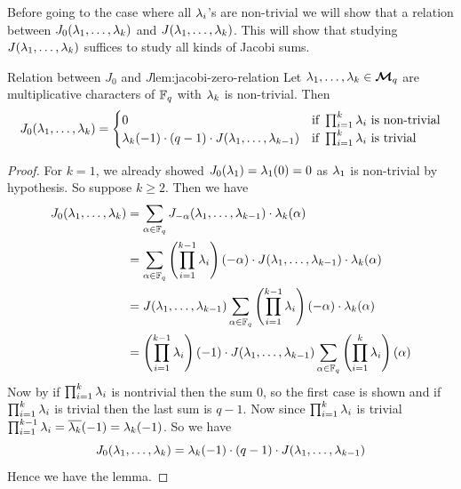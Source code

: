 Before going to the case where all $\lambda_i$'s are non-trivial we will show that a relation between $J_0(\lambda_1,\dots,\lambda_k)$ and $J(\lambda_1,\dots, \lambda_k)$. This will show that studying $J(\lambda_1,\dots, \lambda_k)$ suffices to study all kinds of Jacobi sums. 
\begin{lemma}{Relation between $J_0$ and $J$}{lem:jacobi-zero-relation}
  Let $\lambda_1,\dots,\lambda_k\in\boldsymbol{\mathcal{M}}_q$ are multiplicative characters of $\mathbb{F}_q$ with $\lambda_k$ is non-trivial. Then $$J_0(\lambda_1,\dots,\lambda_k)=\begin{cases}
    0 &\text{if }\prod_{i=1}^k\lambda_i\text{ is non-trivial}\\
    \lambda_k(-1)\cdot (q-1)\cdot J(\lambda_1,\dots,\lambda_{k-1}) & \text{if }\prod_{i=1}^k\lambda_i\text{ is trivial}
  \end{cases}$$
\end{lemma}
\begin{proof}
  For $k=1$, we already showed $J_0(\lambda_1)=\lambda_1(0)=0$ as $\lambda_1$ is non-trivial by hypothesis. So suppose $k\geq 2$. Then we have 
  \begin{align*}
    J_0(\lambda_1,\dots,\lambda_k) & = \sum_{\alpha\in\mathbb{F}_q}J_{-\alpha}(\lambda_1,\dots,\lambda_{k-1})\cdot \lambda_k(\alpha)\\ 
    & = \sum_{\alpha\in\mathbb{F}_q}\left(\prod_{i=1}^{k-1}\lambda_i\right)(-\alpha)\cdot J(\lambda_1,\dots,\lambda_{k-1})\cdot \lambda_k(\alpha)\\ 
    & = J(\lambda_1,\dots,\lambda_{k-1})\sum_{\alpha\in\mathbb{F}_q}\left(\prod_{i=1}^{k-1}\lambda_i\right)(-\alpha)\cdot \lambda_k(\alpha)\\
    & = \left(\prod_{i=1}^{k-1}\lambda_i\right)(-1)\cdot J(\lambda_1,\dots,\lambda_{k-1})\sum_{\alpha\in\mathbb{F}_q}\left(\prod_{i=1}^{k}\lambda_i\right)(\alpha)
  \end{align*}
  Now by  if $\prod_{i=1}^{k}\lambda_i$ is nontrivial then  the sum $0$, so the first case is shown and if $\prod_{i=1}^{k}\lambda_i$ is trivial then the last sum is $q-1$. Now since $\prod_{i=1}^{k}\lambda_i$ is trivial $\prod_{i=1}^{k-1}\lambda_i=\overline{\lambda_k}(-1)=\lambda_k(-1)$. So we have $$J_0(\lambda_1,\dots,\lambda_k)=\lambda_k(-1)\cdot (q-1)\cdot J(\lambda_1,\dots,\lambda_{k-1})$$Hence we have the lemma.
\end{proof}

